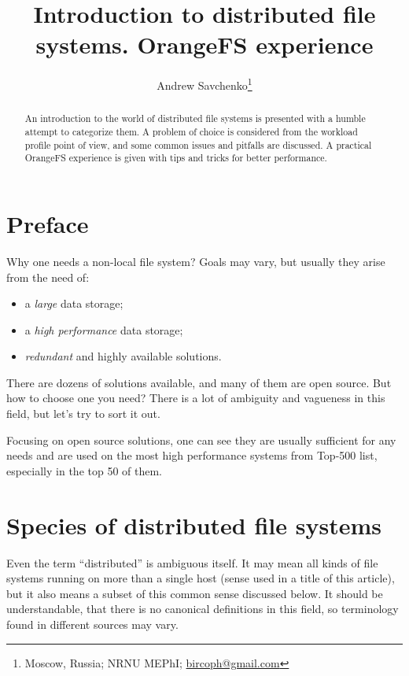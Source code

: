 \documentclass[10pt, a5paper]{article}
\begin{document}
\title{Introduction to distributed file systems. OrangeFS experience}
\author{Andrew Savchenko\footnote{Moscow, Russia; NRNU MEPhI; \url{bircoph@gmail.com}}}
\maketitle
\begin{abstract}
An introduction to the world of distributed file systems is presen\-ted with a humble attempt to categorize them. A problem of choice is
considered from the workload profile point of view, and some common issues and pitfalls are discussed. A practical OrangeFS experience is
given with tips and tricks for better performance.
\end{abstract}
\section*{Preface}

Why one needs a non-local file system? Goals may vary, but usually they arise from the need of:

\begin{itemize}
  \item a \emph{large} data storage;
  \item a \emph{high performance} data storage;
  \item \emph{redundant} and highly available solutions.
\end{itemize}

There are dozens of solutions available\cite{bib1}, and many of them are open source. But how to choose one you need? There is a lot of ambiguity and vagueness in this field, but let's try to sort it out.

Focusing on open source solutions, one can see they are usually sufficient for any needs and are used on the most high performance systems from Top-500\cite{bib2} list, especially in the top 50 of them.

\section*{Species of distributed file systems}

Even the term ``distributed'' is ambiguous itself. It may mean all kinds of file systems running on more than a single host (sense used in a title of this article), but it also means a subset of this common sense discussed below. It should be understandable, that there is no canonical definitions in this field, so terminology found in different sources may vary.
\end{document}
